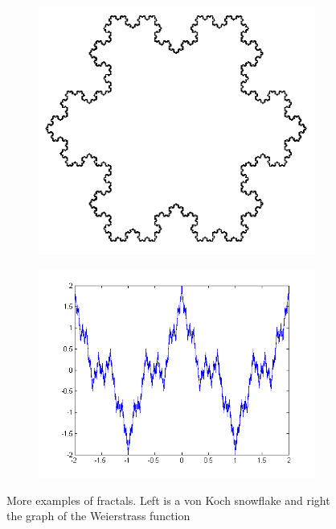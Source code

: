 \begin{figure}[h]
\begin{subfigure}{.5\textwidth}
  \centering
  \includegraphics[width=.8\linewidth]{pics/intro/vonKoch.png}
  \label{fig:sfig1}
\end{subfigure}%
\begin{subfigure}{.5\textwidth}
  \centering
  \includegraphics[width=.8\linewidth]{pics/intro/weierstrass.png}
  \label{fig:sfig2}
\end{subfigure}
\caption{More examples of fractals. Left is a von Koch snowflake and right the graph of the Weierstrass function}
\label{fig:examples2}
\end{figure}



